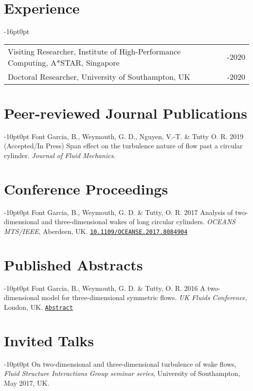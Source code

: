 \documentclass[line]{res}
\newenvironment{p}
  {\begin{adjustwidth}{-10pt}{0pt}}
  {\end{adjustwidth}}
\newenvironment{p1}
  {\begin{adjustwidth}{-16pt}{0pt}
  \vspace{1pt}}
  {\end{adjustwidth}}
\begin{document}
\begin{resume}
\section{Experience}
\begin{p1}
\begin{tabular}{p{} >{\raggedleft\arraybackslash}p{}}
Visiting Researcher, Institute of High-Performance Computing, A*STAR, Singapore & 2017-2020\\
Doctoral Researcher, University of Southampton, UK & 2015-2020
\end{tabular}
\end{p1}
 
\section{Peer-reviewed Journal Publications}
\begin{p}
Font Garcia, B., Weymouth, G. D., Nguyen, V.-T. \& Tutty O. R. 2019 (Accepted/In Press) Span effect on the turbulence nature of flow past a circular cylinder. \textit{Journal of Fluid Mechanics}.
\end{p}

\section{Conference Proceedings}
\begin{p}
Font Garcia, B., Weymouth, G. D.  \&  Tutty, O. R. 2017 Analysis of two-dimensional and three-dimensional wakes of long circular cylinders. {\em OCEANS MTS/IEEE}, Aberdeen, 	UK. \href{https://doi.org/10.1109/OCEANSE.2017.8084904}{\texttt{10.1109/OCEANSE.2017.8084904}}
\end{p}

\section{Published Abstracts}
\begin{p}
Font Garcia, B., Weymouth, G. D.  \&  Tutty, O. R. 2016  A two-dimensional model for three-dimensional symmetric flows. \textit{UK Fluids Conference}, London, UK.  \href{https://www.imperial.ac.uk/media/imperial-college/faculty-of-engineering/aeronautics/UK-Fluids-Conference-2016-booklet.pdf}{\texttt{Abstract}}
\end{p}

\section{Invited Talks}
\begin{p}
On two-dimensional and three-dimensional turbulence of wake flows, \textit{Fluid Structure Interactions Group seminar series}, University of Southampton, May 2017, UK.
\end{p}


\end{resume}
\end{document}
